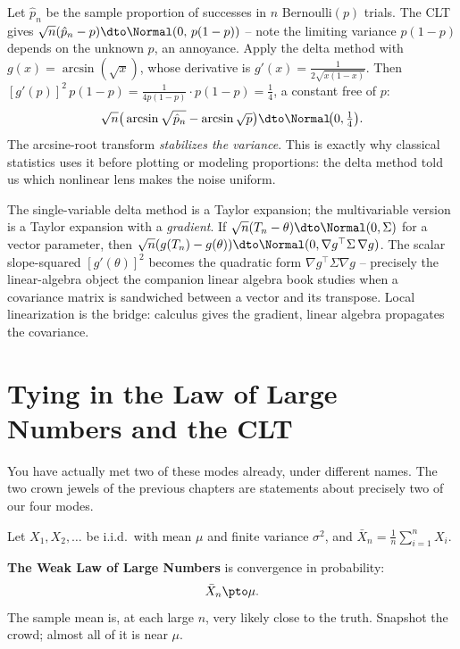 \begin{example}
\label{ch22:ex-arcsine}
Let $\hat p_n$ be the sample proportion of successes in $n$ Bernoulli$(p)$ trials. The
CLT gives $\sqrt n(\hat p_n - p)\dto\Normal(0,\,p(1-p))$ -- note the limiting variance
$p(1-p)$ depends on the unknown $p$, an annoyance. Apply the delta method with
$g(x)=\arcsin(\sqrt x)$, whose derivative is $g'(x)=\frac{1}{2\sqrt{x(1-x)}}$. Then
$[g'(p)]^2\,p(1-p)=\frac{1}{4p(1-p)}\cdot p(1-p)=\frac14$, a constant free of $p$:
\[
  \sqrt n\big(\arcsin\sqrt{\hat p_n}-\arcsin\sqrt p\big)\dto\Normal\!\big(0,\tfrac14\big).
\]
The arcsine-root transform \emph{stabilizes the variance}. This is exactly why
classical statistics uses it before plotting or modeling proportions: the delta method
told us which nonlinear lens makes the noise uniform.
\end{example}

\begin{connectionbox}
The single-variable delta method is a Taylor expansion; the multivariable version is a
Taylor expansion with a \emph{gradient}. If $\sqrt n(T_n-\theta)\dto\Normal(0,\Sigma)$
for a vector parameter, then $\sqrt n(g(T_n)-g(\theta))\dto\Normal(0,\nabla g^\top
\Sigma\,\nabla g)$. The scalar slope-squared $[g'(\theta)]^2$ becomes the quadratic
form $\nabla g^\top\Sigma\nabla g$ -- precisely the linear-algebra object the companion
linear algebra book studies when a covariance matrix is sandwiched between a vector and
its transpose. Local linearization is the bridge: calculus gives the gradient, linear
algebra propagates the covariance.
\end{connectionbox}

\section{Tying in the Law of Large Numbers and the CLT}
\label{ch22:lln-clt}

You have actually met two of these modes already, under different names. The two
crown jewels of the previous chapters are statements about precisely two of our four
modes.

Let $X_1,X_2,\dots$ be i.i.d.\ with mean $\mu$ and finite variance $\sigma^2$, and
$\bar X_n = \frac1n\sum_{i=1}^n X_i$.

\textbf{The Weak Law of Large Numbers} is convergence in probability:
\[
  \bar X_n \pto \mu.
\]
The sample mean is, at each large $n$, very likely close to the truth. Snapshot the
crowd; almost all of it is near $\mu$.

